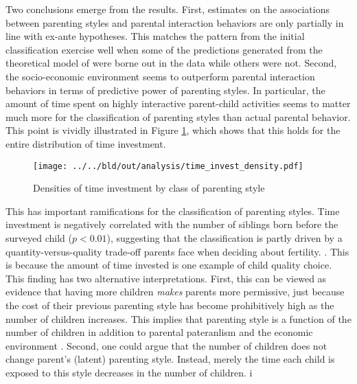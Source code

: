 Two conclusions emerge from the results. First, estimates on the associations between parenting styles and parental interaction behaviors are only partially in line with ex-ante hypotheses. This matches the pattern from the initial classification exercise well when some of the predictions generated from the theoretical model of \textcite{doepkeParentingStyleAltruism2017} were borne out in the data while others were not. Second, the socio-economic environment seems to outperform parental interaction behaviors in terms of predictive power of parenting styles. In particular, the amount of time spent on highly interactive parent-child activities seems to matter much more for the classification of parenting styles than actual parental behavior. This point is vividly illustrated in Figure \ref{fig:density}, which shows that this holds for the entire distribution of time investment.

\begin{figure}[htb]
	\centering
	\texttt{[image: ../../bld/out/analysis/time\_invest\_density.pdf]}
	\caption{Densities of time investment by class of parenting style}
	\vspace{-0.25cm}
	\label{fig:density}  
\end{figure} 

This has important ramifications for the classification of parenting styles. Time investment is negatively correlated with the number of siblings born before the surveyed child ($p < 0.01$), suggesting that the classification is partly driven by a quantity-versus-quality trade-off parents face when deciding about fertility. \parencite{beckerTreatiseFamily1981}. This is because the amount of time invested is one example of child quality choice. This finding has two alternative interpretations. First, this can be viewed as evidence that having more children \textit{makes} parents more permissive, just because the cost of their previous parenting style has become prohibitively high as the number of children increases. This implies that parenting style is a function of the number of children in addition to parental pateranlism and the economic environment \parencite{doepkeEconomicsParenting2019}. Second, one could argue that the number of children does not change parent's (latent) parenting style. Instead, merely the time each child is exposed to this style decreases in the number of children. i

